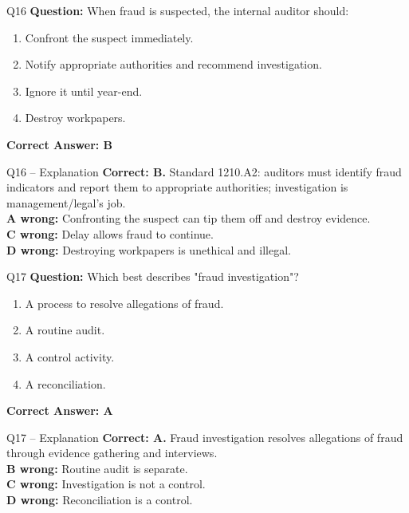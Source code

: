 \documentclass[aspectratio=169,10pt]{beamer}
\begin{document}
	\begin{frame}[t]{Q16}
		\small
		\textbf{Question:} When fraud is suspected, the internal auditor should:
		\begin{enumerate}[label=\Alph*.,itemsep=1pt,topsep=2pt]
			\item Confront the suspect immediately.
			\item Notify appropriate authorities and recommend investigation.
			\item Ignore it until year-end.
			\item Destroy workpapers.
		\end{enumerate}
		\vspace{4pt}
		\textbf{Correct Answer: B}
	\end{frame}
	
	\begin{frame}[t]{Q16 -- Explanation}
		\small
		\textbf{Correct: B.} Standard 1210.A2: auditors must identify fraud indicators and report them to appropriate authorities; investigation is management/legal's job. \\[4pt]
		\textbf{A wrong:} Confronting the suspect can tip them off and destroy evidence. \\[2pt]
		\textbf{C wrong:} Delay allows fraud to continue. \\[2pt]
		\textbf{D wrong:} Destroying workpapers is unethical and illegal.
	\end{frame}
	
	\begin{frame}[t]{Q17}
		\small
		\textbf{Question:} Which best describes "fraud investigation"?
		\begin{enumerate}[label=\Alph*.,itemsep=1pt,topsep=2pt]
			\item A process to resolve allegations of fraud.
			\item A routine audit.
			\item A control activity.
			\item A reconciliation.
		\end{enumerate}
		\vspace{4pt}
		\textbf{Correct Answer: A}
	\end{frame}
	
	\begin{frame}[t]{Q17 -- Explanation}
		\small
		\textbf{Correct: A.} Fraud investigation resolves allegations of fraud through evidence gathering and interviews. \\[4pt]
		\textbf{B wrong:} Routine audit is separate. \\[2pt]
		\textbf{C wrong:} Investigation is not a control. \\[2pt]
		\textbf{D wrong:} Reconciliation is a control.
	\end{frame}
	
\end{document}
